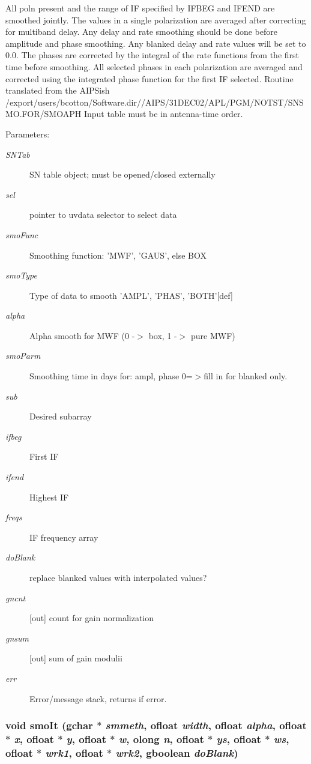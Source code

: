 All poln present and the range of IF specified by IFBEG and IFEND are smoothed jointly. The values in a single polarization are averaged after correcting for multiband delay. Any delay and rate smoothing should be done before amplitude and phase smoothing. Any blanked delay and rate values will be set to 0.0. The phases are corrected by the integral of the rate functions from the first time before smoothing. All selected phases in each polarization are averaged and corrected using the integrated phase function for the first IF selected. Routine translated from the AIPSish /export/users/bcotton/Software.dir//AIPS/31DEC02/APL/PGM/NOTST/SNSMO.FOR/SMOAPH Input table must be in antenna-time order. \begin{Desc}
\item[Parameters:]
\begin{description}
\item[{\em SNTab}]SN table object; must be opened/closed externally \item[{\em sel}]pointer to uvdata selector to select data \item[{\em smo\-Func}]Smoothing function: 'MWF', 'GAUS', else BOX \item[{\em smo\-Type}]Type of data to smooth 'AMPL', 'PHAS', 'BOTH'[def] \item[{\em alpha}]Alpha smooth for MWF (0 -$>$ box, 1 -$>$ pure MWF) \item[{\em smo\-Parm}]Smoothing time in days for: ampl, phase 0=$>$fill in for blanked only. \item[{\em sub}]Desired subarray \item[{\em ifbeg}]First IF \item[{\em ifend}]Highest IF \item[{\em freqs}]IF frequency array \item[{\em do\-Blank}]replace blanked values with interpolated values? \item[{\em gncnt}][out] count for gain normalization \item[{\em gnsum}][out] sum of gain modulii \item[{\em err}]Error/message stack, returns if error. \end{description}
\end{Desc}
\subsubsection{\setlength{\rightskip}{0pt plus 5cm}void smo\-It (gchar $\ast$ {\em smmeth}, {\bf ofloat} {\em width}, {\bf ofloat} {\em alpha}, {\bf ofloat} $\ast$ {\em x}, {\bf ofloat} $\ast$ {\em y}, {\bf ofloat} $\ast$ {\em w}, {\bf olong} {\em n}, {\bf ofloat} $\ast$ {\em ys}, {\bf ofloat} $\ast$ {\em ws}, {\bf ofloat} $\ast$ {\em wrk1}, {\bf ofloat} $\ast$ {\em wrk2}, gboolean {\em do\-Blank})}\label{ObitUVSoln_8c_a19}


